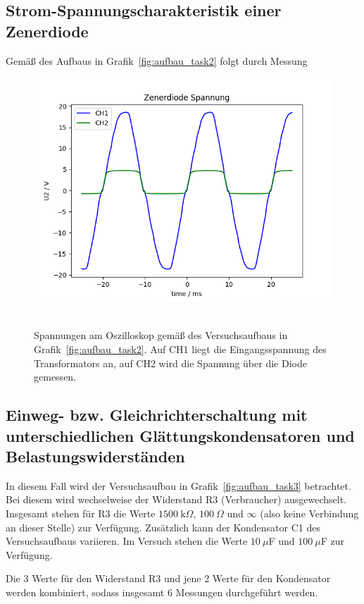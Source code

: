 \documentclass{article}
\begin{document}
\subsection{Strom-Spannungscharakteristik einer Zenerdiode}

Gemäß des Aufbaus in Grafik~\ref{fig:aufbau_task2} folgt durch Messung


\begin{figure}[H]
\caption{Spannungen am Oszilloskop gemäß des Versuchsaufbaus in Grafik~\ref{fig:aufbau_task2}. Auf CH1 liegt die Eingangsspannung des Transformators an, auf CH2 wird die Spannung über die Diode gemessen.}
\label{fig:grafik_task2}
{\centering
\includegraphics[scale=0.7]{bilder/task2.png}
~
}
\end{figure}

\subsection{Einweg- bzw. Gleichrichterschaltung mit unterschiedlichen Glättungskondensatoren und Belastungswiderständen}

In diesem Fall wird der Versuchsaufbau in Grafik~\ref{fig:aufbau_task3} betrachtet. Bei diesem wird wechselweise der Widerstand R3 (Verbraucher) ausgewechselt. Insgesamt stehen für R3 die Werte $1500~\text{k}\Omega$, $100~\Omega$ und $\infty$ (also keine Verbindung an dieser Stelle) zur Verfügung. Zusätzlich kann der Kondensator C1 des Versuchsaufbaus variieren. Im Versuch stehen die Werte $10~\mu$F und $100~\mu$F zur Verfügung.

Die 3 Werte für den Widerstand R3 und jene 2 Werte für den Kondensator werden kombiniert, sodass insgesamt 6 Messungen durchgeführt werden.
\end{document}
